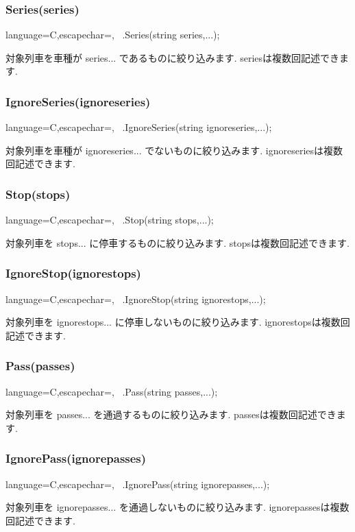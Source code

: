 \documentclass[paper={550pt,2910pt},lualatex , ja=standard]{bxjsreport}
\begin{document}
\subsubsection*{Series(series)}
\begin{reflisting}[]{language=C,escapechar=\@,}
~.Series(string series,...);
\end{reflisting}
対象列車を車種が series... であるものに絞り込みます.
seriesは複数回記述できます.
\subsubsection*{IgnoreSeries(ignoreseries)}
\begin{reflisting}[]{language=C,escapechar=\@,}
~.IgnoreSeries(string ignoreseries,...);
\end{reflisting}
対象列車を車種が ignoreseries... でないものに絞り込みます.
ignoreseriesは複数回記述できます.
\subsubsection*{Stop(stops)}
\begin{reflisting}[]{language=C,escapechar=\@,}
~.Stop(string stops,...);
\end{reflisting}
対象列車を stops... に停車するものに絞り込みます.
stopsは複数回記述できます.
\subsubsection*{IgnoreStop(ignorestops)}
\begin{reflisting}[]{language=C,escapechar=\@,}
~.IgnoreStop(string ignorestops,...);
\end{reflisting}
対象列車を ignorestops... に停車しないものに絞り込みます.
ignorestopsは複数回記述できます.
\subsubsection*{Pass(passes)}
\begin{reflisting}[]{language=C,escapechar=\@,}
~.Pass(string passes,...);
\end{reflisting}
対象列車を passes... を通過するものに絞り込みます.
passesは複数回記述できます.
\subsubsection*{IgnorePass(ignorepasses)}
\begin{reflisting}[]{language=C,escapechar=\@,}
~.IgnorePass(string ignorepasses,...);
\end{reflisting}
対象列車を ignorepasses... を通過しないものに絞り込みます.
ignorepassesは複数回記述できます.
\end{document}
